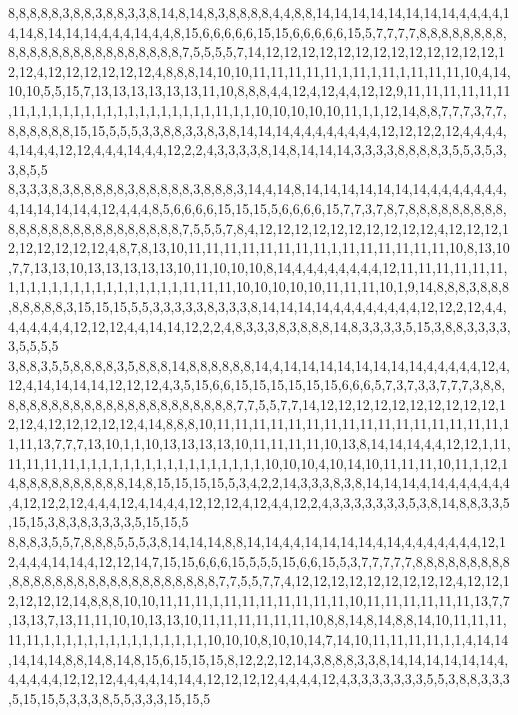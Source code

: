 8,8,8,8,8,3,8,8,3,8,8,3,3,8,14,8,14,8,3,8,8,8,8,4,4,8,8,14,14,14,14,14,14,14,14,4,4,4,4,14,14,8,14,14,14,4,4,4,14,4,4,8,15,6,6,6,6,6,15,15,6,6,6,6,6,15,5,7,7,7,7,8,8,8,8,8,8,8,8,8,8,8,8,8,8,8,8,8,8,8,8,8,8,8,8,7,5,5,5,5,7,14,12,12,12,12,12,12,12,12,12,12,12,12,12,12,12,4,12,12,12,12,12,12,4,8,8,8,14,10,10,11,11,11,11,11,1,11,1,11,1,11,11,11,10,4,14,10,10,5,5,15,7,13,13,13,13,13,13,11,10,8,8,8,4,4,12,4,12,4,4,12,12,9,11,11,11,11,11,11,11,1,1,1,1,1,1,1,1,1,1,1,1,1,1,1,1,1,11,1,1,10,10,10,10,10,11,1,1,12,14,8,8,7,7,7,3,7,7,8,8,8,8,8,8,15,15,5,5,5,3,3,8,8,3,3,8,3,8,14,14,14,4,4,4,4,4,4,4,4,12,12,12,2,12,4,4,4,4,4,14,4,4,12,12,4,4,4,14,4,4,12,2,2,4,3,3,3,3,8,14,8,14,14,14,3,3,3,3,8,8,8,8,3,5,5,3,5,3,3,8,5,5
8,3,3,3,8,3,8,8,8,8,8,3,8,8,8,8,8,3,8,8,8,3,14,4,14,8,14,14,14,14,14,14,14,4,4,4,4,4,4,4,4,14,14,14,14,4,12,4,4,4,8,5,6,6,6,6,15,15,15,5,6,6,6,6,15,7,7,3,7,8,7,8,8,8,8,8,8,8,8,8,8,8,8,8,8,8,8,8,8,8,8,8,8,8,8,8,7,5,5,5,7,8,4,12,12,12,12,12,12,12,12,12,12,4,12,12,12,12,12,12,12,12,12,4,8,7,8,13,10,11,11,11,11,11,11,11,11,1,11,11,11,11,11,11,10,8,13,10,7,7,13,13,10,13,13,13,13,13,10,11,10,10,10,8,14,4,4,4,4,4,4,4,4,12,11,11,11,11,11,11,1,1,1,1,1,1,1,1,1,1,1,1,1,1,1,1,11,11,11,10,10,10,10,10,11,11,11,10,1,9,14,8,8,8,3,8,8,8,8,8,8,8,8,3,15,15,15,5,5,3,3,3,3,3,8,3,3,3,8,14,14,14,14,4,4,4,4,4,4,4,4,12,12,2,12,4,4,4,4,4,4,4,4,12,12,12,4,4,14,14,12,2,2,4,8,3,3,3,8,3,8,8,8,14,8,3,3,3,3,5,15,3,8,8,3,3,3,3,3,5,5,5,5
3,8,8,3,5,5,8,8,8,8,3,5,8,8,8,14,8,8,8,8,8,8,14,4,14,14,14,14,14,14,14,14,4,4,4,4,4,12,4,12,4,14,14,14,14,12,12,12,4,3,5,15,6,6,15,15,15,15,15,15,6,6,6,5,7,3,7,3,3,7,7,7,3,8,8,8,8,8,8,8,8,8,8,8,8,8,8,8,8,8,8,8,8,8,8,8,7,7,5,5,7,7,14,12,12,12,12,12,12,12,12,12,12,12,12,4,12,12,12,12,12,4,14,8,8,8,10,11,11,11,11,11,11,11,11,11,11,11,11,11,11,11,11,11,11,13,7,7,7,13,10,1,1,10,13,13,13,13,10,11,11,11,11,10,13,8,14,14,14,4,4,12,12,1,11,11,11,11,11,1,1,1,1,1,1,1,1,1,1,1,1,1,1,1,1,1,10,10,10,4,10,14,10,11,11,11,10,11,1,12,14,8,8,8,8,8,8,8,8,8,8,14,8,15,15,15,15,5,3,4,2,2,14,3,3,3,8,3,8,14,14,14,4,14,4,4,4,4,4,4,4,12,12,2,12,4,4,4,12,4,14,4,4,12,12,12,4,12,4,4,12,2,4,3,3,3,3,3,3,3,5,3,8,14,8,8,3,3,5,15,15,3,8,3,8,3,3,3,3,5,15,15,5
8,8,8,3,5,5,7,8,8,8,5,5,5,3,8,14,14,14,8,8,14,14,4,4,14,14,14,14,4,14,4,4,4,4,4,4,4,12,12,4,4,4,14,14,4,12,12,14,7,15,15,6,6,6,15,5,5,5,15,6,6,15,5,3,7,7,7,7,7,8,8,8,8,8,8,8,8,8,8,8,8,8,8,8,8,8,8,8,8,8,8,8,8,8,8,8,8,7,7,5,5,7,7,4,12,12,12,12,12,12,12,12,12,4,12,12,12,12,12,12,14,8,8,8,10,10,11,11,11,1,11,11,11,11,11,11,11,10,11,11,11,11,11,11,13,7,7,13,13,7,13,11,11,10,10,13,13,10,11,11,11,11,11,11,10,8,8,14,8,14,8,8,14,10,11,11,11,11,11,1,1,1,1,1,1,1,1,1,1,1,1,1,1,1,10,10,10,8,10,10,14,7,14,10,11,11,11,11,1,1,4,14,14,14,14,14,8,8,14,8,14,8,15,6,15,15,15,8,12,2,2,12,14,3,8,8,8,3,3,8,14,14,14,14,14,14,4,4,4,4,4,4,12,12,12,4,4,4,4,14,14,4,12,12,12,12,4,4,4,4,12,4,3,3,3,3,3,3,3,5,5,3,8,8,3,3,3,5,15,15,5,3,3,3,8,5,5,3,3,3,15,15,5
